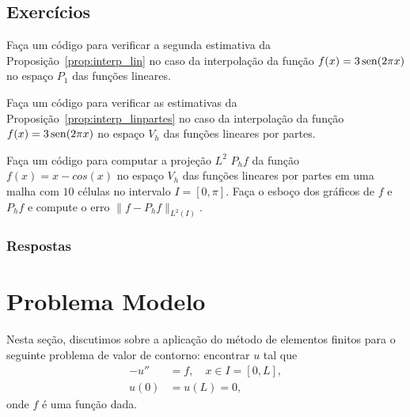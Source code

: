 % 

\subsection{Exercícios}
\badgeRevisar

\begin{exer}
  Faça um código para verificar a segunda estimativa da Proposição~\ref{prop:interp_lin} no caso da interpolação da função $f(x) = 3\operatorname{sen}(2\pi x)$ no espaço $P_1$ das funções lineares.
\end{exer}
\begin{resp}
  \badgeConstrucao
\end{resp}


\begin{exer}
  Faça um código para verificar as estimativas da Proposição~\ref{prop:interp_linpartes} no caso da interpolação da função $f(x) = 3\operatorname{sen}(2\pi x)$ no espaço $V_h$ das funções lineares por partes.
\end{exer}
\begin{resp}
  \badgeConstrucao
\end{resp}

\begin{exer}
  Faça um código para computar a projeção $L^2$ $P_hf$ da função $f(x) = x - cos(x)$ no espaço $V_h$ das funções lineares por partes em uma malha com $10$ células no intervalo $I = [0, \pi]$. Faça o esboço dos gráficos de $f$ e $P_hf$ e compute o erro $\|f-P_hf\|_{L^2(I)}$.
\end{exer}

\subsubsection{Respostas}

\shipoutAnswer

\section{Problema Modelo}\label{cap_mef1d_sec_modelo}
\badgeRevisar

Nesta seção, discutimos sobre a aplicação do método de elementos finitos para o seguinte problema de valor de contorno: encontrar $u$ tal que
\begin{align}
  -u'' &= f,\quad x\in I=[0,L],\label{eq:prob_eq}\\
  u(0) &= u(L) = 0,\label{eq:prob_bc}
\end{align}
onde $f$ é uma função dada.

